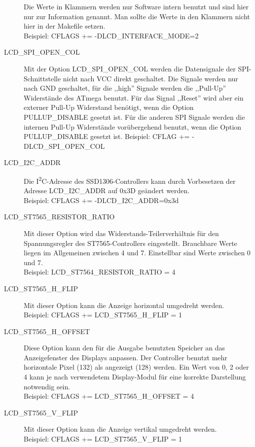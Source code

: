 \begin{description}
Die Werte in Klammern werden nur Software intern benutzt und sind hier nur zur Information genannt.
Man sollte die Werte in den Klammern nicht hier in der Makefile setzen.\\
Beispiel: CFLAGS += -DLCD\_INTERFACE\_MODE=2

  \item[LCD\_SPI\_OPEN\_COL] Mit der Option LCD\_SPI\_OPEN\_COL werden die Datensignale der SPI-Schnittstelle
nicht nach VCC direkt geschaltet.
Die Signale werden nur nach GND geschaltet, für die ,,high'' Signale werden die ,,Pull-Up'' Widerstände
des ATmega benutzt.
Für das Signal ,,Reset'' wird aber ein externer Pull-Up Widerstand benötigt, wenn die Option PULLUP\_DISABLE
gesetzt ist. Für die anderen SPI Signale werden die internen Pull-Up Widerstände vorübergehend benutzt,
wenn die Option PULLUP\_DISABLE gesetzt ist.
Beispiel: CFLAG += -DLCD\_SPI\_OPEN\_COL

 \item[LCD\_I2C\_ADDR] Die I\textsuperscript{2}C-Adresse des SSD1306-Controllers kann durch Vorbesetzen der Adresse LCD\_I2C\_ADDR
auf 0x3D geändert werden.\\
Beispiel: CFLAGS += -DLCD\_I2C\_ADDR=0x3d

  \item[LCD\_ST7565\_RESISTOR\_RATIO] Mit dieser Option wird das Widerstands-Teilerverhältnis für den
Spannungsregler des ST7565-Controllers eingestellt. Brauchbare Werte liegen im Allgemeinen zwischen 4 und 7.
Einstellbar sind Werte zwischen 0 und 7.\\
Beispiel: LCD\_ST7564\_RESISTOR\_RATIO = 4

  \item[LCD\_ST7565\_H\_FLIP] Mit dieser Option kann die Anzeige horizontal umgedreht werden.\\
Beispiel: CFLAGS += LCD\_ST7565\_H\_FLIP = 1

  \item[LCD\_ST7565\_H\_OFFSET] Diese Option kann den für die Ausgabe benutzten Speicher an das Anzeigefenster des
 Displays anpassen. Der Controller benutzt mehr horizontale Pixel (132) als angezeigt (128) werden.
 Ein Wert von 0, 2 oder 4 kann je nach verwendetem Display-Modul für eine korrekte Darstellung notwendig sein.\\
Beispiel: CFLAGS += LCD\_ST7565\_H\_OFFSET = 4

  \item[LCD\_ST7565\_V\_FLIP] Mit dieser Option kann die Anzeige vertikal umgedreht werden.\\
Beispiel: CFLAGS += LCD\_ST7565\_V\_FLIP = 1


\end{description}
